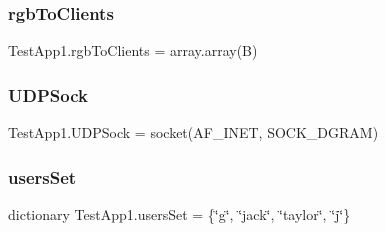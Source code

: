 \subsubsection{\texorpdfstring{rgb\+To\+Clients}{rgbToClients}}
{\footnotesize\ttfamily Test\+App1.\+rgb\+To\+Clients = array.\+array(\textquotesingle{}B\textquotesingle{})}

\mbox{\label{namespaceTestApp1_a4386f942521f81813915fef86956135c}} 
\subsubsection{\texorpdfstring{U\+D\+P\+Sock}{UDPSock}}
{\footnotesize\ttfamily Test\+App1.\+U\+D\+P\+Sock = socket(A\+F\+\_\+\+I\+N\+ET, S\+O\+C\+K\+\_\+\+D\+G\+R\+AM)}

\mbox{\label{namespaceTestApp1_a9774a750e020395749cf1405ef7a19aa}} 
\subsubsection{\texorpdfstring{users\+Set}{usersSet}}
{\footnotesize\ttfamily dictionary Test\+App1.\+users\+Set = \{\char`\"{}g\char`\"{}, \char`\"{}jack\char`\"{}, \char`\"{}taylor\char`\"{}, \char`\"{}j\char`\"{}\}}

